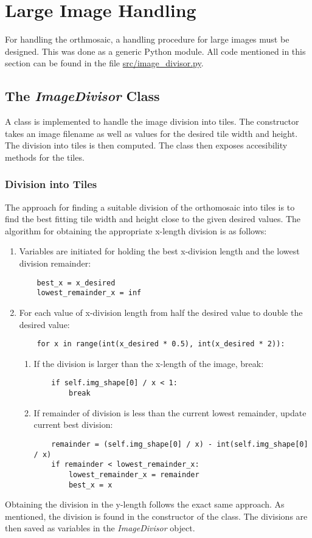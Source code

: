 \documentclass[../Head/Main.tex]{subfiles}
\begin{document}
\section{Large Image Handling}\label{sec:imageHandling}
For handling the orthmosaic, a handling procedure for large images must be designed. This was done as a generic Python module. All code mentioned in this section can be found in the file \url{src/image_divisor.py}.

\vspace{-5pt}
\subsection{The \textit{ImageDivisor} Class}
A class is implemented to handle the image division into tiles. The constructor takes an image filename as well as values for the desired tile width and height. The division into tiles is then computed. The class then exposes accesibility methods for the tiles.

\subsubsection{Division into Tiles}
The approach for finding a suitable division of the orthomosaic into tiles is to find the best fitting tile width and height close to the given desired values. The algorithm for obtaining the appropriate x-length division is as follows:
\begin{enumerate}
\item Variables are initiated for holding the best x-division length and the lowest division remainder:
\begin{verbatim}
    best_x = x_desired
    lowest_remainder_x = inf
\end{verbatim}
\item For each value of x-division length from half the desired value to double the desired value:
\begin{verbatim}
    for x in range(int(x_desired * 0.5), int(x_desired * 2)):
\end{verbatim}
\begin{enumerate}
\item If the division is larger than the x-length of the image, break:
\begin{verbatim}
    if self.img_shape[0] / x < 1:
        break
\end{verbatim}
\item If remainder of division is less than the current lowest remainder, update current best division:
\begin{verbatim}
    remainder = (self.img_shape[0] / x) - int(self.img_shape[0] / x)
    if remainder < lowest_remainder_x:
        lowest_remainder_x = remainder
        best_x = x
\end{verbatim}
\end{enumerate}
\end{enumerate}
Obtaining the division in the y-length follows the exact same approach. As mentioned, the division is found in the constructor of the class. The divisions are then saved as variables in the \textit{ImageDivisor} object.
\end{document}
